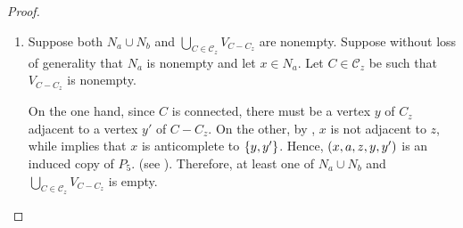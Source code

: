 \begin{proof}
\begin{enumerate}[label=(\roman*)]
            \begin{figure}[htb!]
                \centering
                \caption{An induced copy of $P_5$ given that $N_\varnothing$ is
                    not anticomplete to $N_Y$.}
                \label{fig:additional_4}
            \end{figure}
        
        \item Suppose both $N_{a}\cup N_{b}$ and $\bigcup_{C\in\mathcal{C}_z}
            V_{C-C_z}$ are nonempty. Suppose without loss of generality that
            $N_a$ is nonempty and let $x\in N_a$. Let $C\in \mathcal{C}_z$
            be such that $V_{C-C_z}$ is nonempty. 
            
            On the one hand, since $C$ is connected, there must be a vertex $y$
            of $C_z$ adjacent to a vertex $y'$ of $C-C_z$. On the other, by
            , $x$ is not adjacent to $z$, while
             implies that $x$ is anticomplete to
            $\left\{y,y'\right\}$. Hence, $\left(x,a,z,y,y'\right)$ is an  induced copy of $P_5$.
            (see ). Therefore, at least one of $N_{a}\cup
            N_{b}$ and $\bigcup_{C\in\mathcal{C}_z} V_{C-C_z}$ is empty.


\end{enumerate}
\end{proof}
